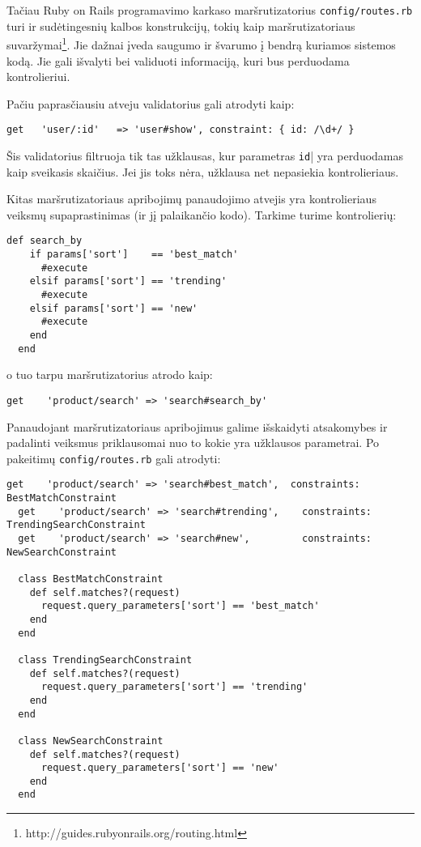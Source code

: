 Tačiau Ruby on Rails programavimo karkaso maršrutizatorius \lstinline|config/routes.rb| turi ir sudėtingesnių kalbos konstrukcijų, tokių kaip maršrutizatoriaus suvaržymai\footnote{http://guides.rubyonrails.org/routing.html}. Jie dažnai įveda saugumo ir švarumo į bendrą kuriamos sistemos kodą. Jie gali išvalyti bei validuoti informaciją, kuri bus perduodama kontrolieriui.

Pačiu paprasčiausiu atveju validatorius gali atrodyti kaip:

\begin{lstlisting}[]
get   'user/:id'   => 'user#show', constraint: { id: /\d+/ }
\end{lstlisting}

Šis validatorius filtruoja tik tas užklausas, kur parametras \lstinline|id|| yra perduodamas kaip sveikasis skaičius. Jei jis toks nėra, užklausa net nepasiekia kontrolieriaus.

Kitas maršrutizatoriaus apribojimų panaudojimo atvejis yra kontrolieriaus veiksmų supaprastinimas (ir jį palaikančio kodo). Tarkime turime kontrolierių:

\begin{lstlisting}[]
  def search_by
    if params['sort']    == 'best_match'
      #execute
    elsif params['sort'] == 'trending'
      #execute
    elsif params['sort'] == 'new'
      #execute
    end
  end
\end{lstlisting}

o tuo tarpu maršrutizatorius atrodo kaip:

\begin{lstlisting}[]
  get    'product/search' => 'search#search_by'
\end{lstlisting}

Panaudojant maršrutizatoriaus apribojimus galime išskaidyti atsakomybes ir padalinti veiksmus priklausomai nuo to kokie yra užklausos parametrai. Po pakeitimų \lstinline{config/routes.rb} gali atrodyti:

\begin{lstlisting}[]
  get    'product/search' => 'search#best_match',  constraints: BestMatchConstraint
  get    'product/search' => 'search#trending',    constraints: TrendingSearchConstraint
  get    'product/search' => 'search#new',         constraints: NewSearchConstraint

  class BestMatchConstraint
    def self.matches?(request)
      request.query_parameters['sort'] == 'best_match'
    end
  end

  class TrendingSearchConstraint
    def self.matches?(request)
      request.query_parameters['sort'] == 'trending'
    end
  end

  class NewSearchConstraint
    def self.matches?(request)
      request.query_parameters['sort'] == 'new'
    end
  end
\end{lstlisting}

